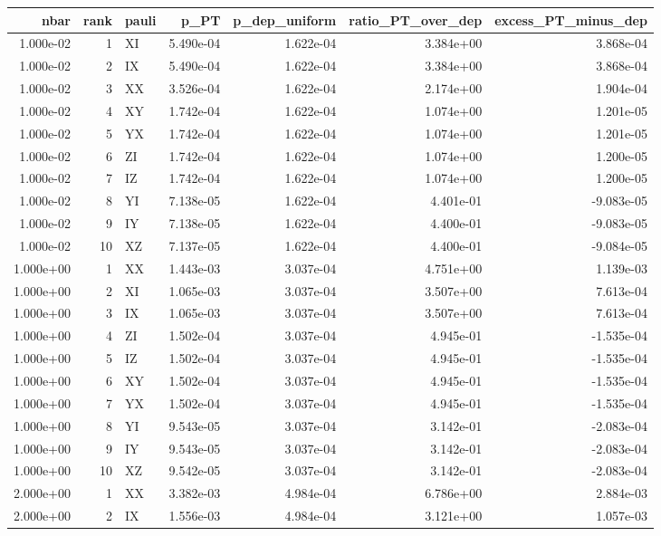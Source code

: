 \begin{tabular}{rrlrrrr}
\toprule
nbar & rank & pauli & p_PT & p_dep_uniform & ratio_PT_over_dep & excess_PT_minus_dep \\
\midrule
1.000e-02 & 1 & XI & 5.490e-04 & 1.622e-04 & 3.384e+00 & 3.868e-04 \\
1.000e-02 & 2 & IX & 5.490e-04 & 1.622e-04 & 3.384e+00 & 3.868e-04 \\
1.000e-02 & 3 & XX & 3.526e-04 & 1.622e-04 & 2.174e+00 & 1.904e-04 \\
1.000e-02 & 4 & XY & 1.742e-04 & 1.622e-04 & 1.074e+00 & 1.201e-05 \\
1.000e-02 & 5 & YX & 1.742e-04 & 1.622e-04 & 1.074e+00 & 1.201e-05 \\
1.000e-02 & 6 & ZI & 1.742e-04 & 1.622e-04 & 1.074e+00 & 1.200e-05 \\
1.000e-02 & 7 & IZ & 1.742e-04 & 1.622e-04 & 1.074e+00 & 1.200e-05 \\
1.000e-02 & 8 & YI & 7.138e-05 & 1.622e-04 & 4.401e-01 & -9.083e-05 \\
1.000e-02 & 9 & IY & 7.138e-05 & 1.622e-04 & 4.400e-01 & -9.083e-05 \\
1.000e-02 & 10 & XZ & 7.137e-05 & 1.622e-04 & 4.400e-01 & -9.084e-05 \\
1.000e+00 & 1 & XX & 1.443e-03 & 3.037e-04 & 4.751e+00 & 1.139e-03 \\
1.000e+00 & 2 & XI & 1.065e-03 & 3.037e-04 & 3.507e+00 & 7.613e-04 \\
1.000e+00 & 3 & IX & 1.065e-03 & 3.037e-04 & 3.507e+00 & 7.613e-04 \\
1.000e+00 & 4 & ZI & 1.502e-04 & 3.037e-04 & 4.945e-01 & -1.535e-04 \\
1.000e+00 & 5 & IZ & 1.502e-04 & 3.037e-04 & 4.945e-01 & -1.535e-04 \\
1.000e+00 & 6 & XY & 1.502e-04 & 3.037e-04 & 4.945e-01 & -1.535e-04 \\
1.000e+00 & 7 & YX & 1.502e-04 & 3.037e-04 & 4.945e-01 & -1.535e-04 \\
1.000e+00 & 8 & YI & 9.543e-05 & 3.037e-04 & 3.142e-01 & -2.083e-04 \\
1.000e+00 & 9 & IY & 9.543e-05 & 3.037e-04 & 3.142e-01 & -2.083e-04 \\
1.000e+00 & 10 & XZ & 9.542e-05 & 3.037e-04 & 3.142e-01 & -2.083e-04 \\
2.000e+00 & 1 & XX & 3.382e-03 & 4.984e-04 & 6.786e+00 & 2.884e-03 \\
2.000e+00 & 2 & IX & 1.556e-03 & 4.984e-04 & 3.121e+00 & 1.057e-03 \\

\end{tabular}
